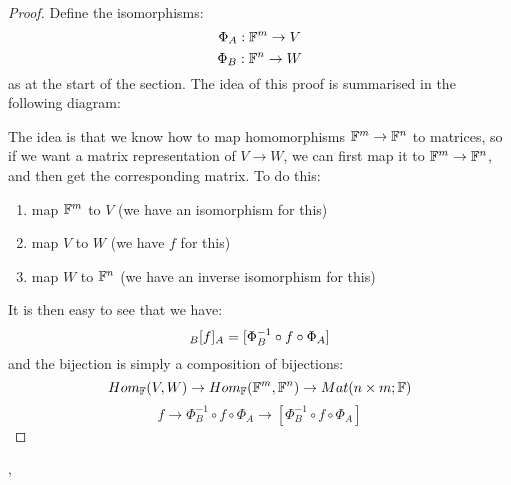 \documentclass{exam}
\begin{document}
\begin{proof}

Define the isomorphisms:
\[
\Phi_A : \F^m \to V
\]
\[
\Phi_B : \F^n \to W
\]
as at the start of the section. The idea of this proof is summarised in the following diagram:
\begin{figure}[H]
    \centering
\end{figure}

The idea is that we know how to map homomorphisms $\F^m \to \F^n$ to matrices, so if we want a matrix representation of $V \to W$, we can first map it to $\F^m \to \F^n$, and then get the corresponding matrix. To do this:
\begin{enumerate}
    \item map $\F^m$ to $V$ (we have an isomorphism for this)
    \item map $V$ to $W$ (we have $f$ for this)
    \item map $W$ to $\F^n$ (we have an inverse isomorphism for this)
\end{enumerate}
It is then easy to see that we have:
\[
\cript{f}{B}{A} = [\Phi_B^{-1} \circ f \circ \Phi_A]
\]
and the bijection is simply a composition of bijections:
\[
Hom_\F(V,W)  \to Hom_\F(\F^m, \F^n) \to Mat(n \times m; \F)
\]
\[
f \to \Phi_B^{-1} \circ f \circ \Phi_A \to [\Phi_B^{-1} \circ f \circ \Phi_A]
\]

\end{proof}

\sep 
\end{document}
